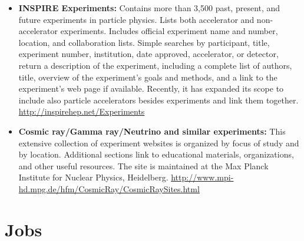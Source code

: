 \begin{itemize}
\item
  \textbf{INSPIRE Experiments:} Contains more than 3,500 past, present,
  and future experiments in particle physics. Lists both accelerator and
  non-accelerator experiments. Includes official experiment name and
  number, location, and collaboration lists. Simple searches by
  participant, title, experiment number, institution, date approved,
  accelerator, or detector, return a description of the experiment,
  including a complete list of authors, title, overview of the
  experiment's goals and methods, and a link to the experiment's web
  page if available. Recently, it has expanded its scope to include also
  particle accelerators besides experiments and link them together.
  \url{http://inspirehep.net/Experiments}
\item
  \textbf{Cosmic ray/Gamma ray/Neutrino and similar experiments:} This
  extensive collection of experiment websites is organized by focus of
  study and by location. Additional sections link to educational
  materials, organizations, and other useful resources. The site is
  maintained at the Max Planck Institute for Nuclear Physics,
  Heidelberg.
  \url{http://www.mpi-hd.mpg.de/hfm/CosmicRay/CosmicRaySites.html}
\end{itemize}

\section{Jobs}\label{jobs}

